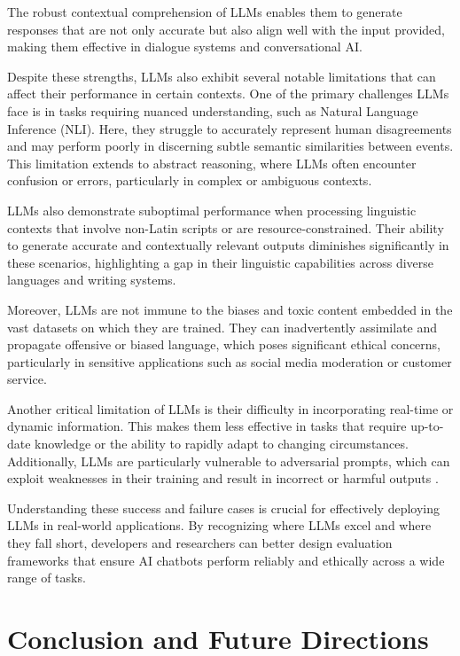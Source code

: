 The robust contextual comprehension of LLMs enables them to generate responses that are not only accurate but also align well with the input provided, making them effective in dialogue systems and conversational AI.

Despite these strengths, LLMs also exhibit several notable limitations that can affect their performance in certain contexts. One of the primary challenges LLMs face is in tasks requiring nuanced understanding, such as Natural Language Inference (NLI). Here, they struggle to accurately represent human disagreements and may perform poorly in discerning subtle semantic similarities between events. This limitation extends to abstract reasoning, where LLMs often encounter confusion or errors, particularly in complex or ambiguous contexts.

LLMs also demonstrate suboptimal performance when processing linguistic contexts that involve non-Latin scripts or are resource-constrained. Their ability to generate accurate and contextually relevant outputs diminishes significantly in these scenarios, highlighting a gap in their linguistic capabilities across diverse languages and writing systems.

Moreover, LLMs are not immune to the biases and toxic content embedded in the vast datasets on which they are trained. They can inadvertently assimilate and propagate offensive or biased language, which poses significant ethical concerns, particularly in sensitive applications such as social media moderation or customer service.

Another critical limitation of LLMs is their difficulty in incorporating real-time or dynamic information. This makes them less effective in tasks that require up-to-date knowledge or the ability to rapidly adapt to changing circumstances. Additionally, LLMs are particularly vulnerable to adversarial prompts, which can exploit weaknesses in their training and result in incorrect or harmful outputs \cite{chang2024survey}.

Understanding these success and failure cases is crucial for effectively deploying LLMs in real-world applications. By recognizing where LLMs excel and where they fall short, developers and researchers can better design evaluation frameworks that ensure AI chatbots perform reliably and ethically across a wide range of tasks.

\section{Conclusion and Future Directions}

